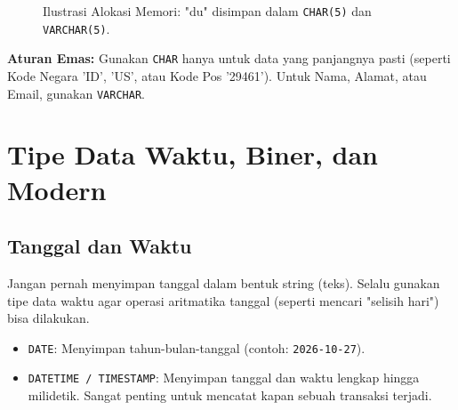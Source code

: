 \documentclass[11pt,a4paper]{article}
\begin{document}
\begin{figure}[H]
	\centering
	\caption{Ilustrasi Alokasi Memori: "du" disimpan dalam \texttt{CHAR(5)} dan \texttt{VARCHAR(5)}.}
\end{figure}

\noindent\textbf{Aturan Emas:} Gunakan \texttt{CHAR} hanya untuk data yang panjangnya pasti (seperti Kode Negara 'ID', 'US', atau Kode Pos '29461'). Untuk Nama, Alamat, atau Email, gunakan \texttt{VARCHAR}.

\section{Tipe Data Waktu, Biner, dan Modern}

\subsection{Tanggal dan Waktu}
Jangan pernah menyimpan tanggal dalam bentuk string (teks). Selalu gunakan tipe data waktu agar operasi aritmatika tanggal (seperti mencari "selisih hari") bisa dilakukan.
\begin{itemize}
	\item \texttt{DATE}: Menyimpan tahun-bulan-tanggal (contoh: \texttt{2026-10-27}).
	\item \texttt{DATETIME / TIMESTAMP}: Menyimpan tanggal dan waktu lengkap hingga milidetik. Sangat penting untuk mencatat kapan sebuah transaksi terjadi.
\end{itemize}
\end{document}
